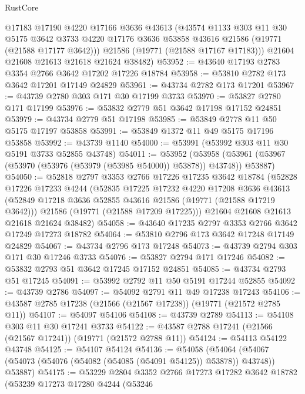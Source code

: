 \begin{lexlean}{RustCore}
\begin{coremodule}
        @17183
        @17190
        @4220
        @17166
        @3636
        @43613
        (@43574
          @1133
          @303
          @11
          @30
          @5175
          @3642
          @3733
          @4220
          @17176
          @3636
          @53858
          @43616
          @21586
          (@19771 (@21588 @17177 @3642)))
        @21586
        (@19771 (@21588 @17167 @17183)))
      @21604
      @21608
      @21613
      @21618
      @21624
      @38482)
@53952 := @43640 @17193 @2783 @3354 @2766 @3642 @17202 @17226 @18784
@53958 := @53810 @2782 @173 @3642 @17201 @17149 @24829
@53961 := @43734 @2782 @173 @17201
@53967 := @43739 @2780 @303 @171 @30 @17199 @3733
@53970 := @53827 @2780 @171 @17199
@53976 := @53832 @2779 @51 @3642 @17198 @17152 @24851
@53979 := @43734 @2779 @51 @17198
@53985 := @53849 @2778 @11 @50 @5175 @17197 @53858
@53991 := @53849 @1372 @11 @49 @5175 @17196 @53858
@53992 := @43739 @1140
@54000 := @53991 (@53992 @303 @11 @30 @5191 @3733 @52855 @43748)
@54011 := @53952
    (@53958 (@53961 (@53967 (@53970 (@53976 (@53979 (@53985 @54000)) @53878)) @43748)) @53887)
@54050 := @52818
    @2797
    @3353
    @2766
    @17226
    @17235
    @3642
    @18784
    (@52828
      @17226
      @17233
      @4244
      (@52835
        @17225
        @17232
        @4220
        @17208
        @3636
        @43613
        (@52849 @17218 @3636 @52855 @43616 @21586 (@19771 (@21588 @17219 @3642)))
        @21586
        (@19771 (@21588 @17209 @17225)))
      @21604
      @21608
      @21613
      @21618
      @21624
      @38482)
@54058 := @43640 @17235 @2797 @3353 @2766 @3642 @17249 @17273 @18782
@54064 := @53810 @2796 @173 @3642 @17248 @17149 @24829
@54067 := @43734 @2796 @173 @17248
@54073 := @43739 @2794 @303 @171 @30 @17246 @3733
@54076 := @53827 @2794 @171 @17246
@54082 := @53832 @2793 @51 @3642 @17245 @17152 @24851
@54085 := @43734 @2793 @51 @17245
@54091 := @53992 @2792 @11 @50 @5191 @17244 @52855
@54092 := @43739 @2786
@54097 := @54092 @2791 @11 @49 @17238 @17243
@54106 := @43587 @2785 @17238 (@21566 (@21567 @17238)) (@19771 (@21572 @2785 @11))
@54107 := @54097 @54106
@54108 := @43739 @2789
@54113 := @54108 @303 @11 @30 @17241 @3733
@54122 := @43587 @2788 @17241 (@21566 (@21567 @17241)) (@19771 (@21572 @2788 @11))
@54124 := @54113 @54122 @43748
@54125 := @54107 @54124
@54136 := @54058
    (@54064 (@54067 (@54073 (@54076 (@54082 (@54085 (@54091 @54125)) @53878)) @43748)) @53887)
@54175 := @53229
    @2804
    @3352
    @2766
    @17273
    @17282
    @3642
    @18782
    (@53239
      @17273
      @17280
      @4244
      (@53246

\end{coremodule}
\end{lexlean}
